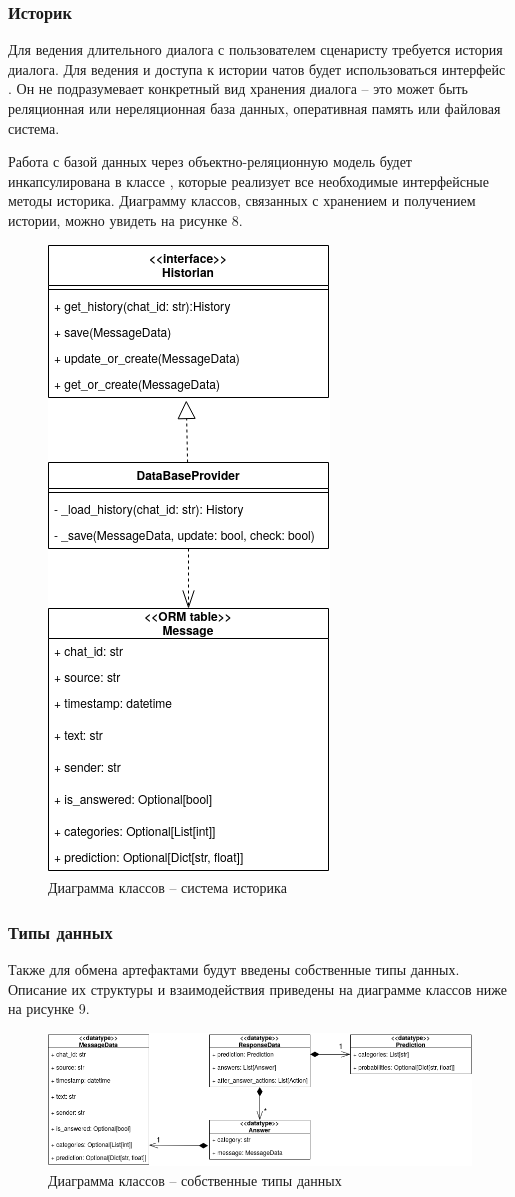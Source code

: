     \newpage
    \subsubsection{Историк}
    Для ведения длительного диалога с пользователем сценаристу требуется история
    диалога. Для ведения и доступа к истории чатов будет использоваться интерфейс
    . Он не подразумевает конкретный вид хранения
    диалога -- это может быть реляционная или нереляционная база данных,
    оперативная память или файловая система.
    
    Работа с базой данных через объектно-реляционную модель будет инкапсулирована
    в классе , которые реализует все необходимые интерфейсные
    методы историка. Диаграмму классов, связанных с хранением и получением
    истории, можно увидеть на рисунке 8.
    \begin{figure}[H]
        \centering

        \includegraphics[width=0.3\linewidth]{static/ClassDiagram_dbprovider.png}
        \caption{Диаграмма классов -- система историка}
        \label{fig:class-diagram-dbprovider}
    \end{figure}

    \newpage
    \subsubsection{Типы данных}
    Также для обмена артефактами будут введены собственные типы данных.
    Описание их структуры и взаимодействия приведены на диаграмме классов ниже
    на рисунке 9.
    \begin{figure}[H]
        \centering
        \includegraphics[width=\linewidth]{static/ClassDiagram_datatypes.png}
        \caption{Диаграмма классов -- собственные типы данных}
        \label{fig:class-diagram-datatypes}
    \end{figure}

